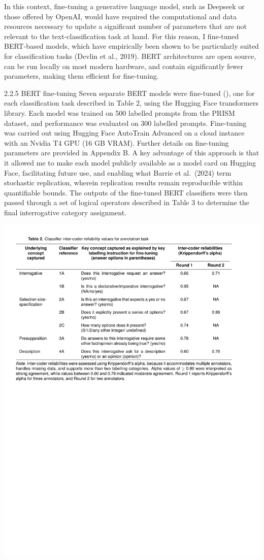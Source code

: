 \documentclass[
  12pt,
]{article}
\begin{document}
In this context, fine-tuning a generative language model, such as Deepseek or those offered by OpenAI, would have required the computational and data resources necessary to update a significant number of parameters that are not relevant to the text-classification task at hand. For this reason, I fine-tuned BERT-based models, which have empirically been shown to be particularly suited for classification tasks (Devlin et al., 2019). BERT architectures are open source, can be run locally on most modern hardware, and contain significantly fewer parameters, making them efficient for fine-tuning.

2.2.5 BERT fine-tuning
Seven separate BERT models were fine-tuned (), one for each classification task described in Table 2, using the Hugging Face transformers library. Each model was trained on 500 labelled prompts from the PRISM dataset, and performance was evaluated on 300 labelled prompts. Fine-tuning was carried out using Hugging Face AutoTrain Advanced on a cloud instance with an Nvidia T4 GPU (16 GB VRAM). Further details on fine-tuning parameters are provided in Appendix B. A key advantage of this approach is that it allowed me to make each model publicly available as a model card on Hugging Face, facilitating future use, and enabling what Barrie et al.~(2024) term stochastic replication, wherein replication results remain reproducible within quantifiable bounds. The outputs of the fine-tuned BERT classifiers were then passed through a set of logical operators described in Table 3 to determine the final interrogative category assignment.

\includegraphics{../03_outputs/01_taxonomies_of_interrogatives/table_2.pdf}
\end{document}
